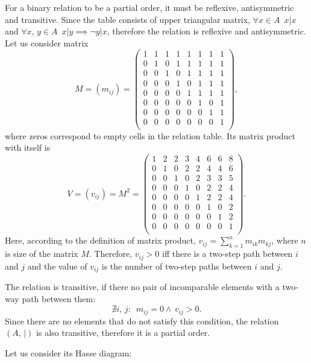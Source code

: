 \documentclass[14pt,a4paper]{extarticle}
\begin{document}
	For a binary relation to be a partial order, it must be reflexive, antisymmetric and transitive. Since the table consists of upper triangular matrix, $\forall x\in A \,\,\, x|x$ and $\forall x,\, y \in A \,\,\, x|y \implies \lnot y|x$, therefore the relation is reflexive and antisymmetric. Let us consider matrix
	\[M=\left(m_{ij}\right)=\begin{pmatrix}
		1 & 1 & 1 & 1 & 1 & 1 & 1 & 1\\
		0 & 1 & 0 & 1 & 1 & 1 & 1 & 1\\
		0 & 0 & 1 & 0 & 1 & 1 & 1 & 1\\
		0 & 0 & 0 & 1 & 0 & 1 & 1 & 1\\
		0 & 0 & 0 & 0 & 1 & 1 & 1 & 1\\
		0 & 0 & 0 & 0 & 0 & 1 & 0 & 1\\
		0 & 0 & 0 & 0 & 0 & 0 & 1 & 1\\
		0 & 0 & 0 & 0 & 0 & 0 & 0 & 1\\
	\end{pmatrix},\]
	where zeros correspond to empty cells in the relation table. Its matrix product with itself is
	\[V = \left(v_{ij}\right) = M^2 =\begin{pmatrix}
		1 & 2 & 2 & 3 & 4 & 6 & 6 & 8\\
		0 & 1 & 0 & 2 & 2 & 4 & 4 & 6\\
		0 & 0 & 1 & 0 & 2 & 3 & 3 & 5\\
		0 & 0 & 0 & 1 & 0 & 2 & 2 & 4\\
		0 & 0 & 0 & 0 & 1 & 2 & 2 & 4\\
		0 & 0 & 0 & 0 & 0 & 1 & 0 & 2\\
		0 & 0 & 0 & 0 & 0 & 0 & 1 & 2\\
		0 & 0 & 0 & 0 & 0 & 0 & 0 & 1\\
	\end{pmatrix}.\]
	Here, according to the definition of matrix product, $v_{ij} = \sum\limits_{k=1}^{n}m_{ik}m_{kj}$, where $n$ is size of the matrix $M$. Therefore, $v_{ij}>0$ iff there is a two-step path between $i$ and $j$ and the value of $v_{ij}$ is the number of two-step paths between $i$ and $j$. 
	
	The relation is transitive, if there no pair of incomparable elements with a two-way path between them:
	\[\nexists i,\, j: \,\,\, m_{ij} = 0\land\, v_{ij} > 0.\]
	Since there are no elements that do not satisfy this condition, the relation $(A,\,|)$ is also transitive, therefore it is a partial order.
	
	\newpage
	Let us consider its Hasse diagram:
	
\end{document}
